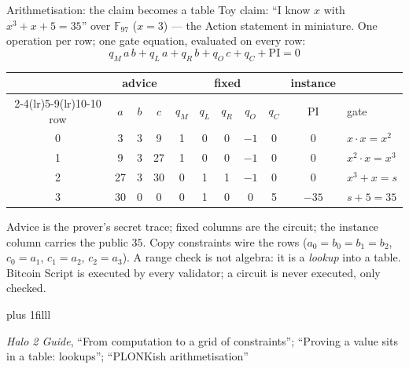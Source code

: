 \documentclass[aspectratio=169,11pt]{beamer}
\newcommand{\F}{\mathbb{F}}
\newcommand{\src}[1]{\par\vskip0pt plus 1filll
  {\fontsize{6}{7.2}\selectfont\color{arbdim}\raggedright #1\par}}
\begin{document}
\begin{frame}{Arithmetisation: the claim becomes a table}
Toy claim: ``I know $x$ with $x^3 + x + 5 = 35$'' over $\F_{97}$
($x = 3$) --- the Action statement in miniature. One operation per row;
one gate equation, evaluated on every row:
\[
q_M\, a\, b + q_L\, a + q_R\, b + q_O\, c + q_C + \mathrm{PI} = 0
\]
\begin{center}\small
\begin{tabular}{@{}c ccc ccccc c l@{}}
\toprule
& \multicolumn{3}{c}{advice} & \multicolumn{5}{c}{fixed} & instance & \\
\cmidrule(lr){2-4}\cmidrule(lr){5-9}\cmidrule(lr){10-10}
row & $a$ & $b$ & $c$ & $q_M$ & $q_L$ & $q_R$ & $q_O$ & $q_C$
  & $\mathrm{PI}$ & gate \\
\midrule
0 & 3 & 3 & 9 & 1 & 0 & 0 & $-1$ & 0 & 0 & $x \cdot x = x^2$ \\
1 & 9 & 3 & 27 & 1 & 0 & 0 & $-1$ & 0 & 0 & $x^2 \cdot x = x^3$ \\
2 & 27 & 3 & 30 & 0 & 1 & 1 & $-1$ & 0 & 0 & $x^3 + x = s$ \\
3 & 30 & 0 & 0 & 0 & 1 & 0 & 0 & 5 & $-35$ & $s + 5 = 35$ \\
\bottomrule
\end{tabular}
\end{center}
Advice is the prover's secret trace; fixed columns are the circuit;
the instance column carries the public $35$. Copy constraints wire the
rows ($a_0 = b_0 = b_1 = b_2$, $c_0 = a_1$, $c_1 = a_2$, $c_2 = a_3$).
A range check is not algebra: it is a \emph{lookup} into a table.
Bitcoin Script is executed by every validator; a circuit is never
executed, only checked.
\src{\emph{Halo 2 Guide}, ``From computation to a grid of constraints'';
``Proving a value sits in a table: lookups''; ``PLONKish
arithmetisation''}
\end{frame}
\end{document}
